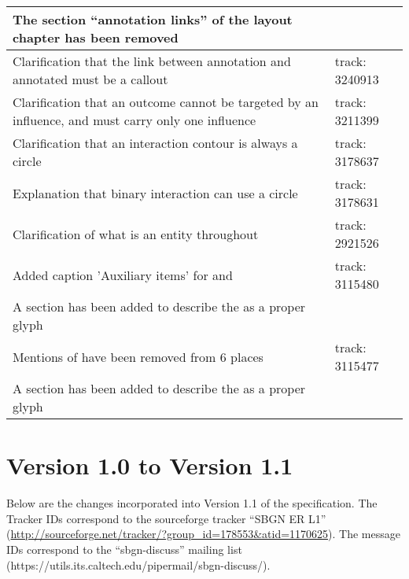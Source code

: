 \begin{center}
\label{tab:revision history 1.2}
\tablelasttail{\hline}
\begin{supertabular}{|p{0.75\textwidth}|p{0.25\textwidth}|}\hline
The section ``annotation links'' of the layout chapter has been removed &  \\\hline
Clarification that the link between annotation and annotated must be a callout & track: 3240913 \\\hline
Clarification that an outcome cannot be targeted by an influence, and must carry only one influence & track: 3211399 \\\hline
Clarification that an interaction contour is always a circle & track: 3178637 \\\hline
Explanation that binary interaction can use a circle & track: 3178631 \\\hline
Clarification of what is an entity throughout & track: 2921526\\\hline
Added caption 'Auxiliary items' for  and  & track: 3115480\\\hline
A section has been added to describe the  as a proper glyph & \\\hline
Mentions of  have been removed from 6 places & track: 3115477\\\hline
A section has been added to describe the  as a proper glyph & \\\hline
\end{supertabular}
\end{center}


\section{Version 1.0 to Version 1.1}

Below are the changes incorporated into Version 1.1 of the \SBGNERLone specification. The Tracker IDs correspond to the sourceforge tracker ``SBGN ER L1'' (\url{http://sourceforge.net/tracker/?group_id=178553&atid=1170625}). The message IDs correspond to the ``sbgn-discuss'' mailing list (https://utils.its.caltech.edu/pipermail/sbgn-discuss/).

